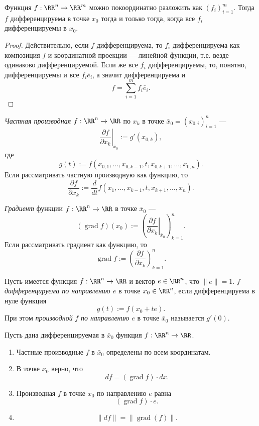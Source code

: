 \documentclass[12pt,a4paper]{article}
\DeclareMathOperator{\grad}{grad}
\begin{document}
    \begin{lemma}\label{range-degree-reduction-in-differentiability-questions-lemma}
        Функция $f: \RR^n \to \RR^m$ можно покоординатно разложить как $(f_i)_{i=1}^m$. Тогда $f$ дифференцируема в точке $x_0$ тогда и только тогда, когда все $f_i$ дифференцируемы в $x_0$.
    \end{lemma}

    \begin{proof}
        Действительно, если $f$ дифференцируема, то $f_i$ дифференцируема как композиция $f$ и координатной проекции --- линейной функции, т.е. везде одинаково дифференцируемой. Если же все $f_i$ дифференцируемы, то, понятно, дифференцируемы и все $f_i \bar{e}_i$, а значит дифференцируема и
        \[f = \sum_{i=1}^m f_i \bar{e}_i.\]
    \end{proof}

    \begin{definition}
        \emph{Частная производная} $f: \RR^n \to \RR$ по $x_k$ в точке $\bar{x}_0 = (x_{0, i})_{i=1}^n$ ---
        \[\left. \frac{\partial f}{\partial x_k} \right|_{\bar{x}_0} := g'(x_{0, k}),\]
        где
        \[g(t) := f(x_{0, 1}, \dots, x_{0, k-1}, t, x_{0, k+1}, \dots, x_{0, n}).\]
        Если рассматривать частную производную как функцию, то
        \[\frac{\partial f}{\partial x_k} := \frac{d}{dt} f(x_1, \dots, x_{k-1}, t, x_{k+1}, \dots, x_n).\]
    \end{definition}

    \begin{definition}
        \emph{Градиент} функции $f: \RR^n \to \RR$ в точке $\bar{x}_0$ ---
        \[(\grad f)(x_0) := \left(\left. \frac{\partial f}{\partial x_k} \right|_{\bar{x}_0}\right)_{k=1}^n.\]
        Если рассматривать градиент как функцию, то
        \[\grad f := \left(\frac{\partial f}{\partial x_k}\right)_{k=1}^n.\]
    \end{definition}

    \begin{definition}
        Пусть имеется функция $f: \RR^n \to \RR$ и вектор $e \in \RR^n$, что $\|e\| = 1$. $f$ \emph{дифференцируема по направлению $e$} в точке $x_0 \in \RR^n$, если дифференцируема в нуле функция
        \[g(t) := f(x_0 + t e).\]
        При этом \emph{производной} $f$ \emph{по направлению $e$} в точке $\bar{x}_0$ называется $g'(0)$.
    \end{definition}

    \begin{lemma}
        Пусть дана дифференцируемая в $\bar{x}_0$ функция $f: \RR^n \to \RR$.
        \begin{enumerate}
            \item Частные производные $f$ в $\bar{x}_0$ определены по всем координатам.
            \item В точке $\bar{x}_0$ верно, что
                \[df = (\grad f) \cdot dx.\]
            \item Производная $f$ в точке $x_0$ по направлению $e$ равна
                \[(\grad f) \cdot e.\]
            \item
                \[\|df\| = \|\grad(f)\|.\]
        \end{enumerate}
    \end{lemma}
\end{document}
